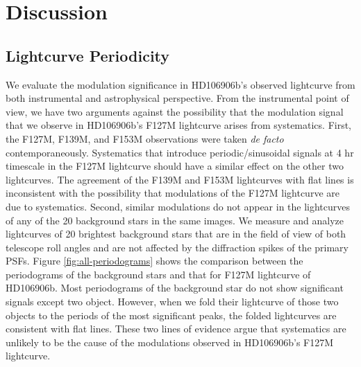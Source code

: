 \documentclass[twocolumn]{aastex62}
\begin{document}





\section{Discussion}
\subsection{Lightcurve Periodicity}

We evaluate the modulation significance in HD106906b's observed lightcurve from both instrumental and astrophysical perspective. From the instrumental point of view, we have two arguments against the possibility that the modulation signal that we {observe} in HD106906b's F127M lightcurve {arises from} systematics. First, the F127M, F139M, and F153M observations were taken \emph{de facto} {contemporaneously}. Systematics that introduce periodic/sinusoidal signals at 4 hr timescale in the F127M lightcurve should have a similar effect on the other two lightcurves. The agreement of the  F139M and F153M lightcurves with flat lines is inconsistent with the possibility that modulations of the F127M lightcurve {are} due to systematics. Second, similar modulations do not appear in the lightcurves of any of the 20 background stars in the same images. We measure and analyze lightcurves of 20 brightest background stars that are in the field of view of both telescope roll angles and are not affected by the diffraction spikes of the primary PSFs.
Figure \ref{fig:all-periodograms} shows the comparison between the periodograms of the background stars and that for F127M lightcurve of HD106906b. Most periodograms of the background star do not show significant signals except two object. However, when we fold their lightcurve of those two objects to the periods of the most significant peaks, the folded lightcurves are consistent with flat lines. These two lines of evidence argue that systematics are unlikely to be the cause of the modulations observed in HD106906b's F127M lightcurve.
\end{document}
